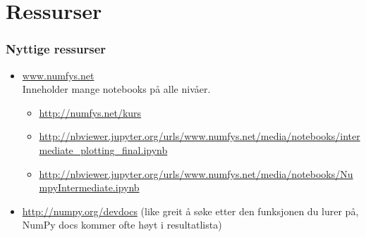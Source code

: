 \documentclass{beamer}
\begin{document}
\section{Ressurser}
\begin{frame}
  \frametitle{Nyttige ressurser}
  \begin{itemize}
  \item \url{www.numfys.net}\\
    Inneholder mange notebooks på alle nivåer.
    \begin{itemize}
    \item \url{http://numfys.net/kurs}
    \item \url{http://nbviewer.jupyter.org/urls/www.numfys.net/media/notebooks/intermediate_plotting_final.ipynb}
    \item \url{http://nbviewer.jupyter.org/urls/www.numfys.net/media/notebooks/NumpyIntermediate.ipynb}
    \end{itemize}

  \item \url{http://numpy.org/devdocs} (like greit å søke etter den funksjonen du lurer på, NumPy docs kommer ofte høyt i resultatlista)
  \end{itemize}
\end{frame}
\end{document}
